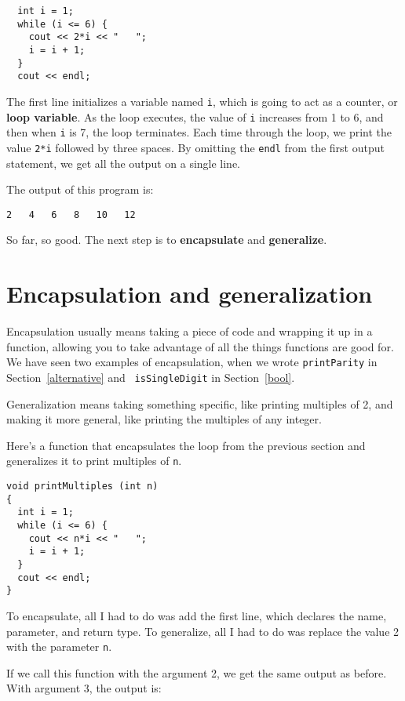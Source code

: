 \begin{lstlisting}
  int i = 1;
  while (i <= 6) {
    cout << 2*i << "   ";
    i = i + 1;
  }
  cout << endl;
\end{lstlisting}
%
The first line initializes a variable named {\tt i}, which is
going to act as a counter, or {\bf loop variable}.  As the
loop executes, the value of {\tt i} increases from 1 to 6,
and then when {\tt i} is 7, the loop terminates.  Each
time through the loop, we print the value {\tt 2*i} followed
by three spaces.  By omitting the {\tt endl} from the
first output statement, we get 
all the output on a single line.


The output of this program is:

\begin{lstlisting}
2   4   6   8   10   12
\end{lstlisting}
%
So far, so good.  The next step is to {\bf encapsulate} and {\bf
generalize}.

\section {Encapsulation and generalization}

Encapsulation usually means taking a piece of code and wrapping it up
in a function, allowing you to take advantage of all the things functions
are good for.  We have seen two examples of encapsulation, when we
wrote {\tt printParity} in Section~\ref{alternative} and {\tt
isSingleDigit} in Section~\ref{bool}.

Generalization means taking something specific, like printing
multiples of 2, and making it more general, like printing the
multiples of any integer.


Here's a function that encapsulates the loop from the previous
section and generalizes it to print multiples of {\tt n}.

\begin{lstlisting}
void printMultiples (int n)
{
  int i = 1;
  while (i <= 6) {
    cout << n*i << "   ";
    i = i + 1;
  }
  cout << endl;
}
\end{lstlisting}
%
To encapsulate, all I had to do was add the first line,
which declares the name, parameter,
and return type.  To generalize, all I had to do was replace
the value 2 with the parameter {\tt n}.

If we call this function with the argument 2, we get the same
output as before.  With argument 3, the output is:

